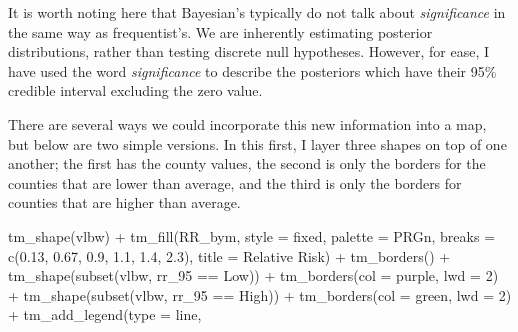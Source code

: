 \documentclass[
]{book}
\newenvironment{Shaded}{\begin{snugshade}}{\end{snugshade}}
\newcommand{\AttributeTok}[1]{\textcolor[rgb]{0.77,0.63,0.00}{#1}}
\newcommand{\DecValTok}[1]{\textcolor[rgb]{0.00,0.00,0.81}{#1}}
\newcommand{\FloatTok}[1]{\textcolor[rgb]{0.00,0.00,0.81}{#1}}
\newcommand{\FunctionTok}[1]{\textcolor[rgb]{0.00,0.00,0.00}{#1}}
\newcommand{\NormalTok}[1]{#1}
\newcommand{\SpecialCharTok}[1]{\textcolor[rgb]{0.00,0.00,0.00}{#1}}
\newcommand{\StringTok}[1]{\textcolor[rgb]{0.31,0.60,0.02}{#1}}
\begin{document}
It is worth noting here that Bayesian's typically do not talk about \emph{significance} in the same way as frequentist's. We are inherently estimating posterior distributions, rather than testing discrete null hypotheses. However, for ease, I have used the word \emph{significance} to describe the posteriors which have their 95\% credible interval excluding the zero value.

There are several ways we could incorporate this new information into a map, but below are two simple versions. In this first, I layer three shapes on top of one another; the first has the county values, the second is only the borders for the counties that are lower than average, and the third is only the borders for counties that are higher than average.

\begin{Shaded}
\begin{Highlighting}[]
\FunctionTok{tm\_shape}\NormalTok{(vlbw) }\SpecialCharTok{+}
  \FunctionTok{tm\_fill}\NormalTok{(}\StringTok{\textquotesingle{}RR\_bym\textquotesingle{}}\NormalTok{,}
          \AttributeTok{style =} \StringTok{\textquotesingle{}fixed\textquotesingle{}}\NormalTok{,}
          \AttributeTok{palette =} \StringTok{\textquotesingle{}PRGn\textquotesingle{}}\NormalTok{,}
          \AttributeTok{breaks =} \FunctionTok{c}\NormalTok{(}\FloatTok{0.13}\NormalTok{, }\FloatTok{0.67}\NormalTok{, }\FloatTok{0.9}\NormalTok{, }\FloatTok{1.1}\NormalTok{, }\FloatTok{1.4}\NormalTok{, }\FloatTok{2.3}\NormalTok{),}
          \AttributeTok{title =} \StringTok{\textquotesingle{}Relative Risk\textquotesingle{}}\NormalTok{) }\SpecialCharTok{+}
  \FunctionTok{tm\_borders}\NormalTok{() }\SpecialCharTok{+} 
\FunctionTok{tm\_shape}\NormalTok{(}\FunctionTok{subset}\NormalTok{(vlbw, rr\_95 }\SpecialCharTok{==} \StringTok{\textquotesingle{}Low\textquotesingle{}}\NormalTok{)) }\SpecialCharTok{+} 
  \FunctionTok{tm\_borders}\NormalTok{(}\AttributeTok{col =} \StringTok{\textquotesingle{}purple\textquotesingle{}}\NormalTok{, }\AttributeTok{lwd =} \DecValTok{2}\NormalTok{) }\SpecialCharTok{+}
\FunctionTok{tm\_shape}\NormalTok{(}\FunctionTok{subset}\NormalTok{(vlbw, rr\_95 }\SpecialCharTok{==} \StringTok{\textquotesingle{}High\textquotesingle{}}\NormalTok{)) }\SpecialCharTok{+} 
  \FunctionTok{tm\_borders}\NormalTok{(}\AttributeTok{col =} \StringTok{\textquotesingle{}green\textquotesingle{}}\NormalTok{, }\AttributeTok{lwd =} \DecValTok{2}\NormalTok{) }\SpecialCharTok{+}
  \FunctionTok{tm\_add\_legend}\NormalTok{(}\AttributeTok{type =} \StringTok{\textquotesingle{}line\textquotesingle{}}\NormalTok{, }

\end{Highlighting}
\end{Shaded}
\end{document}
